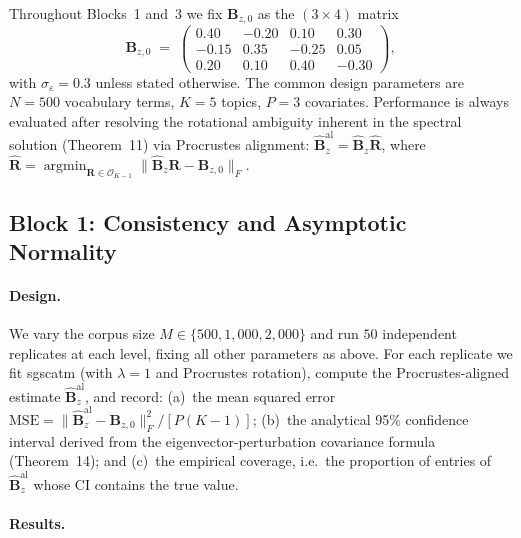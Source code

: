 Throughout Blocks~1 and~3 we fix $\mathbf{B}_{z,0}$ as the
$(3\times 4)$ matrix
%
\begin{equation}
  \mathbf{B}_{z,0}
  \;=\;
  \begin{pmatrix}
     0.40 & -0.20 &  0.10 &  0.30 \\
    -0.15 &  0.35 & -0.25 &  0.05 \\
     0.20 &  0.10 &  0.40 & -0.30
  \end{pmatrix},
  \label{eq:Bz_true}
\end{equation}
%
with $\sigma_\varepsilon = 0.3$ unless stated otherwise.
The common design parameters are $N=500$ vocabulary terms,
$K=5$ topics, $P=3$ covariates.
Performance is always evaluated after resolving the rotational
ambiguity inherent in the spectral solution (Theorem~11)
via Procrustes alignment:
$\hat{\mathbf{B}}_z^{\mathrm{al}} = \hat{\mathbf{B}}_z\hat{\mathbf{R}}$,
where
$\hat{\mathbf{R}} = \mathop{\arg\min}_{\mathbf{R}\in\mathcal{O}_{K-1}}
\|\hat{\mathbf{B}}_z\mathbf{R} - \mathbf{B}_{z,0}\|_F$.


\subsection{Block 1: Consistency and Asymptotic Normality}
\label{subsec:block1}

\paragraph{Design.}
We vary the corpus size $M \in \{500, 1{,}000, 2{,}000\}$ and run
$50$ independent replicates at each level, fixing all other parameters
as above.
For each replicate we fit sgscatm (with $\lambda=1$ and Procrustes
rotation), compute the Procrustes-aligned estimate
$\hat{\mathbf{B}}_z^{\mathrm{al}}$, and record:
(a)~the mean squared error
$\mathrm{MSE} = \|\hat{\mathbf{B}}_z^{\mathrm{al}} - \mathbf{B}_{z,0}\|_F^2 / [P(K-1)]$;
(b)~the analytical 95\% confidence interval derived from the
eigenvector-perturbation covariance formula (Theorem~14);
and (c)~the empirical coverage, i.e.\ the proportion of entries of
$\hat{\mathbf{B}}_z^{\mathrm{al}}$ whose CI contains the true value.

\paragraph{Results.}

